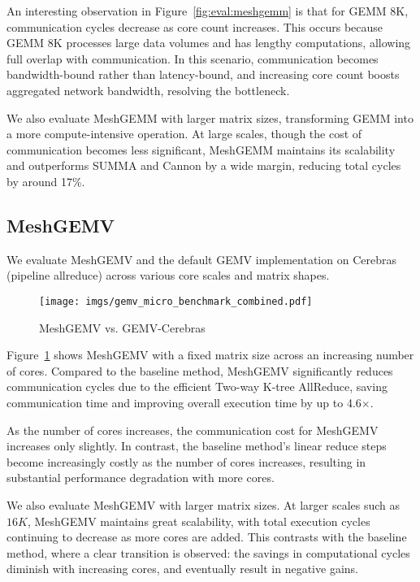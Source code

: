 An interesting observation in Figure~\ref{fig:eval:meshgemm} is that for GEMM 8K, communication cycles decrease as core count increases. This occurs because GEMM 8K processes large data volumes and has lengthy computations, allowing full overlap with communication. In this scenario, communication becomes bandwidth-bound rather than latency-bound, and increasing core count boosts aggregated network bandwidth, resolving the bottleneck.

We also evaluate MeshGEMM with larger matrix sizes, transforming GEMM into a more compute-intensive operation. At large scales, though the cost of communication becomes less significant, MeshGEMM maintains its scalability and outperforms SUMMA and Cannon by a wide margin, reducing total cycles by around 17\%. 

\vspace{-0.2cm}
\subsection{MeshGEMV}
\vspace{-0.2cm}

We evaluate MeshGEMV and the default GEMV implementation on Cerebras (pipeline allreduce) across various core scales and matrix shapes.

\begin{figure}
    \centering
    \texttt{[image: imgs/gemv\_micro\_benchmark\_combined.pdf]}
    \caption{MeshGEMV vs. GEMV-Cerebras}
    \vspace{-0.3cm}
    \label{fig:eval:meshgemv}
\end{figure}
Figure~\ref{fig:eval:meshgemv} shows MeshGEMV with a fixed matrix size across an increasing number of cores. Compared to the baseline method, MeshGEMV significantly reduces communication cycles due to the efficient Two-way K-tree AllReduce, saving communication time and improving overall execution time by up to 4.6$\times$. 

As the number of cores increases, the communication cost for MeshGEMV increases only slightly. In contrast, the baseline method's linear reduce steps become increasingly costly as the number of cores increases, resulting in substantial performance degradation with more cores.

We also evaluate MeshGEMV with larger matrix sizes. At larger scales such as $16K$, MeshGEMV maintains great scalability, with total execution cycles continuing to decrease as more cores are added. This contrasts with the baseline method, where a clear transition is observed: the savings in computational cycles diminish with increasing cores, and eventually result in negative gains.

